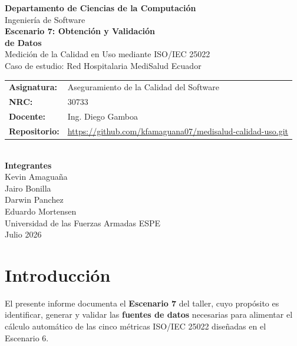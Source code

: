 \documentclass[12pt,a4paper]{article}
\begin{document}
\begin{titlepage}
\centering
{\Large \textbf{Departamento de Ciencias de la Computaci\'on}}\\[0.3cm]
{\large Ingenier\'ia de Software}\\[1.5cm]

{\LARGE \textbf{Escenario 7: Obtenci\'on y Validaci\'on\\de Datos}}\\[0.5cm]
{\large Medici\'on de la Calidad en Uso mediante ISO/IEC 25022}\\[0.3cm]
{\large Caso de estudio: Red Hospitalaria MediSalud Ecuador}\\[2cm]

\begin{tabular}{ll}
\textbf{Asignatura:} & Aseguramiento de la Calidad del Software \\
\textbf{NRC:}        & 30733 \\
\textbf{Docente:}    & Ing. Diego Gamboa \\
\textbf{Repositorio:} & \url{https://github.com/kfamaguana07/medisalud-calidad-uso.git} \\
\end{tabular}\\[1.5cm]

\textbf{Integrantes}\\[0.3cm]
Kevin Amagua\~na \\
Jairo Bonilla \\
Darwin Panchez \\
Eduardo Mortensen \\[2cm]

{\large Universidad de las Fuerzas Armadas ESPE}\\[0.3cm]
{\large Julio 2026}
\end{titlepage}

\tableofcontents
\newpage

\section{Introducci\'on}
El presente informe documenta el \textbf{Escenario 7} del taller, cuyo prop\'osito es identificar, generar y validar las \textbf{fuentes de datos} necesarias para alimentar el c\'alculo autom\'atico de las cinco m\'etricas ISO/IEC 25022 dise\~nadas en el Escenario 6.
\end{document}
